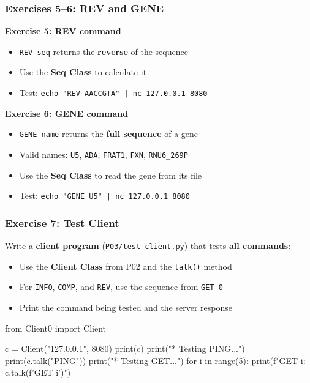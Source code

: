 \documentclass[xcolor=table]{beamer}
\begin{document}
\begin{frame}
\frametitle{Exercises 5--6: REV and GENE}

\textbf{Exercise 5: REV command}
\begin{itemize}
\item \texttt{REV seq} returns the \textbf{reverse} of the sequence
\item Use the \textbf{Seq Class} to calculate it
\item Test: \texttt{echo "REV AACCGTA" | nc 127.0.0.1 8080}
\end{itemize}

\vspace{0.4cm}

\textbf{Exercise 6: GENE command}
\begin{itemize}
\item \texttt{GENE name} returns the \textbf{full sequence} of a gene
\item Valid names: \texttt{U5}, \texttt{ADA}, \texttt{FRAT1}, \texttt{FXN}, \texttt{RNU6\_269P}
\item Use the \textbf{Seq Class} to read the gene from its file
\item Test: \texttt{echo "GENE U5" | nc 127.0.0.1 8080}
\end{itemize}

\end{frame}

\begin{frame}[fragile]
\frametitle{Exercise 7: Test Client}

Write a \textbf{client program} (\texttt{P03/test-client.py}) that tests \textbf{all commands}:

\begin{itemize}
\item Use the \textbf{Client Class} from P02 and the \texttt{talk()} method
\item For \texttt{INFO}, \texttt{COMP}, and \texttt{REV}, use the sequence from \texttt{GET 0}
\item Print the command being tested and the server response
\end{itemize}

\vspace{0.2cm}

\begin{python}
from Client0 import Client

c = Client("127.0.0.1", 8080)
print(c)
print("* Testing PING...")
print(c.talk("PING"))
print("* Testing GET...")
for i in range(5):
    print(f"GET {i}: {c.talk(f'GET {i}')}")
\end{python}

\end{frame}
\end{document}
